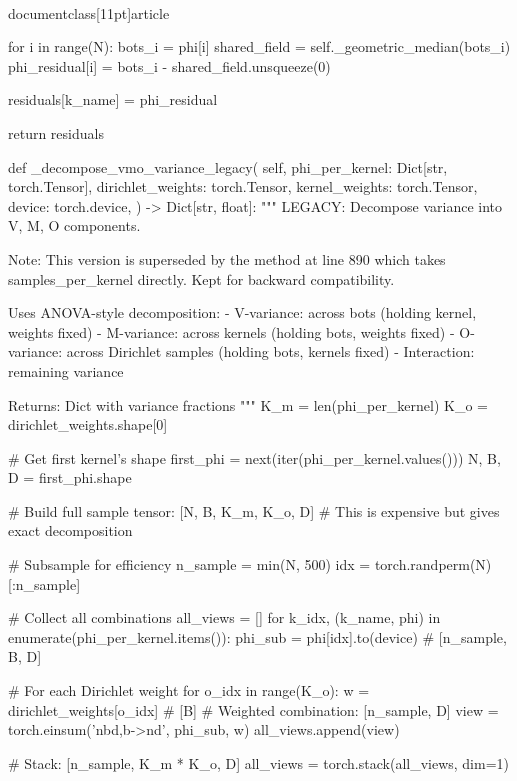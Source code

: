 \\documentclass[11pt]{article}
\begin{document}
\begin{CodeBlock}
{{{{{{{{            for i in range(N):
                bots_i = phi[i]
                shared_field = self._geometric_median(bots_i)
                phi_residual[i] = bots_i - shared_field.unsqueeze(0)

            residuals[k_name] = phi_residual

        return residuals

    def _decompose_vmo_variance_legacy(
        self,
        phi_per_kernel: Dict[str, torch.Tensor],
        dirichlet_weights: torch.Tensor,
        kernel_weights: torch.Tensor,
        device: torch.device,
    ) -> Dict[str, float]:
        """
        LEGACY: Decompose variance into V, M, O components.

        Note: This version is superseded by the method at line 890 which takes
        samples_per_kernel directly. Kept for backward compatibility.

        Uses ANOVA-style decomposition:
        - V-variance: across bots (holding kernel, weights fixed)
        - M-variance: across kernels (holding bots, weights fixed)
        - O-variance: across Dirichlet samples (holding bots, kernels fixed)
        - Interaction: remaining variance

        Returns:
            Dict with variance fractions
        """
        K_m = len(phi_per_kernel)
        K_o = dirichlet_weights.shape[0]
        
        # Get first kernel's shape
        first_phi = next(iter(phi_per_kernel.values()))
        N, B, D = first_phi.shape
        
        # Build full sample tensor: [N, B, K_m, K_o, D]
        # This is expensive but gives exact decomposition
        
        # Subsample for efficiency
        n_sample = min(N, 500)
        idx = torch.randperm(N)[:n_sample]
        
        # Collect all combinations
        all_views = []
        for k_idx, (k_name, phi) in enumerate(phi_per_kernel.items()):
            phi_sub = phi[idx].to(device)  # [n_sample, B, D]
            
            # For each Dirichlet weight
            for o_idx in range(K_o):
                w = dirichlet_weights[o_idx]  # [B]
                # Weighted combination: [n_sample, D]
                view = torch.einsum('nbd,b->nd', phi_sub, w)
                all_views.append(view)
        
        # Stack: [n_sample, K_m * K_o, D]
        all_views = torch.stack(all_views, dim=1)
        
}}}}}}}}
\end{CodeBlock}
\end{document}
